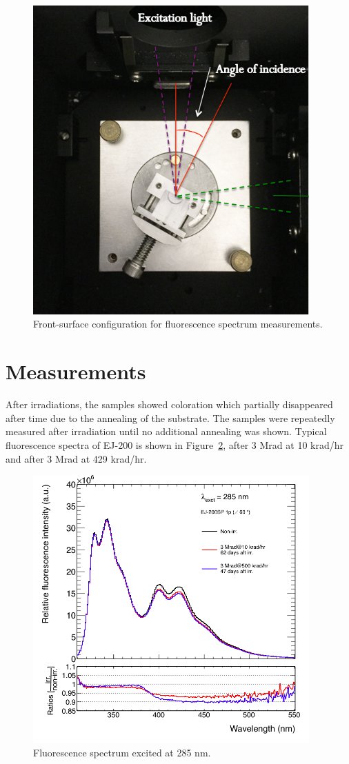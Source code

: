 \documentclass[preprint,12pt]{elsarticle}
\begin{document}
\begin{figure}[!h]
	\centering
	\includegraphics[width=300pt]{./figures/sample_placement.png}
	\caption{Front-surface configuration for fluorescence spectrum measurements.}
	\label{fig:sample_placement}
\end{figure}

\section{Measurements} 
After irradiations, the samples showed coloration which partially disappeared after time due to the annealing of the substrate. 
The samples were repeatedly measured after irradiation until no additional annealing was shown. 
Typical fluorescence spectra of EJ-200 is shown in Figure~\ref{fig:EJ200SP-1P-exc285}, 
after 3 Mrad at 10 krad/hr and after 3 Mrad at 429 krad/hr.

\begin{figure}[!h]
	\centering
	\includegraphics[width=300pt]{./figures/EJ200SP-1P-exc285.png}
	\caption{Fluorescence spectrum excited at 285 nm.}
	\label{fig:EJ200SP-1P-exc285}
\end{figure}
\end{document}
